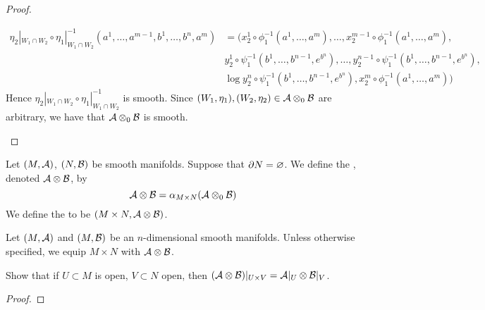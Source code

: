 \documentclass{book}
\begin{document}
\begin{proof}
\begin{itemize}
		\begin{align*}
			\eta_2|_{W_1 \cap W_2} \circ \eta_1|_{W_1 \cap W_2}^{-1}(a^1, \ldots, a^{m-1}, b^1, \ldots, b^n, a^m) 
			& = (x_2^1 \circ \phi^{-1}_1(a^1, \ldots, a^m), \ldots, x_2^{m-1} \circ \phi^{-1}_1(a^1, \ldots, a^m), \\
			& y_2^1 \circ \psi_1^{-1}(b^1, \ldots, b^{n-1}, e^{b^n}), \ldots, y_2^{n-1} \circ \psi_1^{-1}(b^1, \ldots, b^{n-1}, e^{b^n}), \\
			& \log y_2^n \circ \psi_1^{-1}(b^1, \ldots, b^{n-1}, e^{b^n}), x_2^m \circ \phi^{-1}_1(a^1, \ldots, a^m))
		\end{align*}
		Hence  $\eta_2|_{W_1 \cap W_2} \circ \eta_1|_{W_1 \cap W_2}^{-1}$ is smooth. Since $(W_1, \eta_1), (W_2, \eta_2) \in \mathcal{A} \otimes_0 \mathcal{B}$ are arbitrary, we have that $\mathcal{A} \otimes_0 \mathcal{B}$ is smooth.
	\end{itemize}
\end{proof}

\begin{defn} 
	Let $(M, \mathcal{A})$, $(N, \mathcal{B})$ be smooth manifolds. Suppose that $\partial N = \varnothing$. We define the , denoted $\mathcal{A} \otimes \mathcal{B}$, by 
	$$\mathcal{A} \otimes \mathcal{B} = \alpha_{M \times N}(\mathcal{A} \otimes_0 \mathcal{B})$$ 
	We define the  to be $(M \times N, \mathcal{A} \otimes \mathcal{B})$.
\end{defn}


\begin{note} 
	Let $(M, \mathcal{A})$ and $(M, \mathcal{B})$ be an $n$-dimensional smooth manifolds. Unless otherwise specified, we equip $M \times N$ with $\mathcal{A} \otimes \mathcal{B}$.
\end{note}

\begin{ex}
	Show that if $U \subset M$ is open, $V \subset N$ open, then $(\mathcal{A} \otimes \mathcal{B})|_{U \times V} = \mathcal{A}|_U \otimes \mathcal{B}|_V$.
\end{ex}

\begin{proof}
\end{proof}
\end{document}
